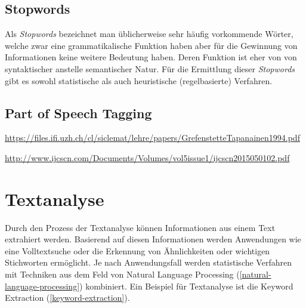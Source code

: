 \subsection{Stopwords}

Als \textit{Stopwords} bezeichnet man üblicherweise sehr häufig vorkommende Wörter, welche zwar eine grammatikalische Funktion haben aber für die Gewinnung von Informationen keine weitere Bedeutung haben. Deren Funktion ist eher von von syntaktischer anstelle semantischer Natur. Für die Ermittlung dieser \textit{Stopwords} gibt es sowohl statistische als auch heuristische (regelbasierte) Verfahren.
\\\cite{wilbur1992automatic,manning2008introduction}


\subsection{Part of Speech Tagging}\label{part-of-speech}


\cite{manning1999foundations,brill1992simple,brill1994some}





\url{https://files.ifi.uzh.ch/cl/siclemat/lehre/papers/GrefenstetteTapanainen1994.pdf}

\url{http://www.ijcscn.com/Documents/Volumes/vol5issue1/ijcscn2015050102.pdf}


\section{\gls{Textanalyse}}
Durch den Prozess der \gls{Textanalyse} können Informationen aus einem Text extrahiert werden. Basierend auf diesen Informationen werden Anwendungen wie eine \gls{Volltextsuche} oder die Erkennung von Ähnlichkeiten oder wichtigen Stichworten ermöglicht. Je nach Anwendungsfall werden statistische Verfahren mit Techniken aus dem Feld von \gls{Natural Language Processing} (\autoref{natural-language-processing}) kombiniert. Ein Beispiel für \gls{Textanalyse} ist die \gls{Keyword Extraction} (\autoref{keyword-extraction}).
\\\cite{tan1999text} 

